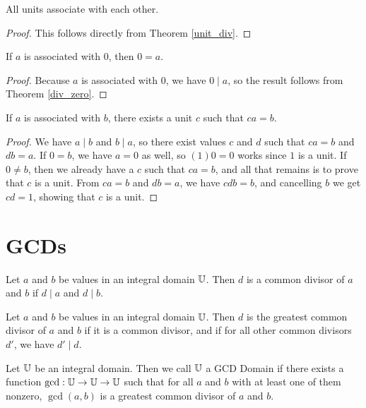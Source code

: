 \documentclass[../../math.tex]{subfiles}
\begin{document}
\begin{theorem} \label{unit_associates}
    All units associate with each other.
\end{theorem}
\begin{proof}
    This follows directly from Theorem \ref{unit_div}.
\end{proof}

\begin{theorem} \label{associates_zero}
    If $a$ is associated with $0$, then $0 = a$.
\end{theorem}
\begin{proof}
    Because $a$ is associated with $0$, we have $0 \mid a$, so the result
    follows from Theorem \ref{div_zero}.
\end{proof}

\begin{theorem} \label{associates_unit}
    If $a$ is associated with $b$, there exists a unit $c$ such that $ca = b$.
\end{theorem}
\begin{proof}
    We have $a \mid b$ and $b \mid a$, so there exist values $c$ and $d$ such
    that $ca = b$ and $db = a$.  If $0 = b$, we have $a = 0$ as well, so $(1)0 =
    0$ works since $1$ is a unit.  If $0 \neq b$, then we already have a $c$
    such that $ca = b$, and all that remains is to prove that $c$ is a unit.
    From $ca = b$ and $db = a$, we have $cdb = b$, and cancelling $b$ we get $cd
    = 1$, showing that $c$ is a unit.
\end{proof}

\section{GCDs}

\begin{definition}
    Let $a$ and $b$ be values in an integral domain $\mathbb{U}$.  Then $d$ is a common
    divisor of $a$ and $b$ if $d \mid a$ and $d \mid b$.
\end{definition}

\begin{definition}
    Let $a$ and $b$ be values in an integral domain $\mathbb{U}$.  Then $d$ is the
    greatest common divisor of $a$ and $b$ if it is a common divisor, and if for
    all other common divisors $d'$, we have $d' \mid d$.
\end{definition}

\begin{class}
    Let $\mathbb{U}$ be an integral domain.  Then we call $\mathbb{U}$ a GCD Domain if there
    exists a function $\gcd : \mathbb{U} \to \mathbb{U} \to \mathbb{U}$ such that for all $a$ and $b$
    with at least one of them nonzero, $\gcd(a, b)$ is a greatest common divisor
    of $a$ and $b$.
\end{class}
\end{document}
